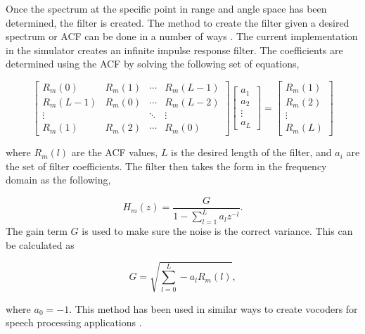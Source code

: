 \documentclass[draft,ras]{agutex}
\begin{document}
\begin{article}

Once the spectrum at the specific point in range and angle space has been determined, the filter is created. The method to create the filter given a desired spectrum or ACF can be done in a number of ways \citep{Kasdin:1995wi}. The current implementation in the simulator creates an infinite impulse response filter. The coefficients are determined using the ACF by solving the following set of equations,

\begin{equation}
\label{eq:filtereq}
\begin{bmatrix} R_m(0) & R_m(1)& \cdots & R_m(L-1) \\ R_m(L-1) & R_m(0)& \cdots & R_m(L-2)\\ \vdots & &\ddots  & \vdots \\  R_m(1) & R_m(2) & \cdots & R_m(0) \end{bmatrix} \left[ \begin{array}{c} a_1\\ a_2\\\vdots \\ a_L \end{array} \right]=\left[ \begin{array}{c} R_m(1) \\ R_m(2)\\ \vdots \\R_m(L) \end{array} \right]
\end{equation}

\noindent where $R_m(l)$ are the ACF values, $L$ is the desired length of the filter, and $ a_i$ are the set of filter coefficients. The filter then takes the form in the frequency domain as the following,

\begin{equation}
\label{eq:filtz}
H_m(z) = \frac{G}{1-\displaystyle \sum_{l=1}^{L} a_l z^{-l}}.
\end{equation}
\noindent The gain term $G$ is used to make sure the noise is the correct variance. This can be calculated as 

\begin{equation}
\label{eq:gainterm}
G=\sqrt{\displaystyle \sum_{l=0}^L -a_l R_m(l)},
\end{equation}

\noindent where $a_0=-1$.  This method has been used in similar ways to create vocoders for speech processing applications \citep{rabinerdigitalspeech}.


\end{article}
\end{document}

